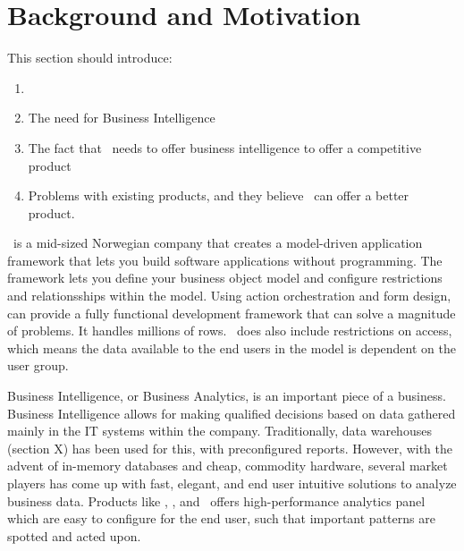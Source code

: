 \section{Background and Motivation}
\label{sec:background-and-motivation}
\begin{secex}
    This section should introduce:
    \begin{enumerate}
      \item \genus
      \item The need for Business Intelligence
      \item The fact that \genus~needs to offer business intelligence to offer a competitive product
      \item Problems with existing products, and they believe \genus~can offer a better product.
    \end{enumerate}
\end{secex}

\genus~is a mid-sized Norwegian company that creates a model-driven application framework that lets you build software applications without programming. The framework lets you define your business object model and configure restrictions and relationsships within the model. Using action orchestration and form design, \genusSoftware can provide a fully functional development framework that can solve a magnitude of problems. It handles millions of rows. \genusSoftware~does also include restrictions on access, which means the data available to the end users in the model is dependent on the user group. 

Business Intelligence, or Business Analytics, is an important piece of a business. Business Intelligence allows for making qualified decisions based on data gathered mainly in the IT systems within the company. Traditionally, data warehouses (section X) has been used for this, with preconfigured reports. However, with the advent of in-memory databases and cheap, commodity hardware, several market players has come up with fast, elegant, and end user intuitive solutions to analyze business data. Products like \qlikview, \tableau, and \powerpivot~offers high-performance analytics panel which are easy to configure for the end user, such that important patterns are spotted and acted upon. 

